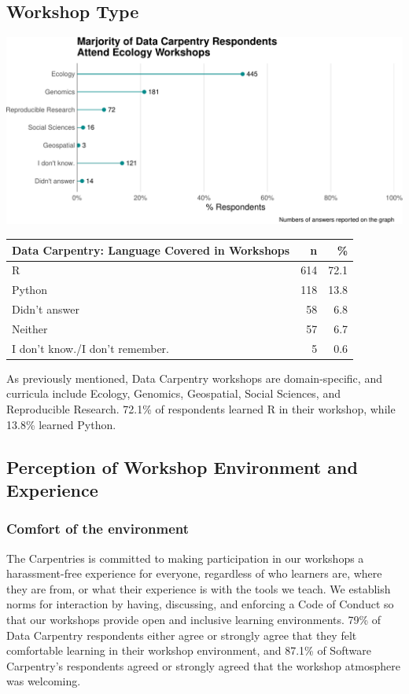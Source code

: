 \documentclass[]{article}
\makeatletter
\def\maxwidth{\ifdim\Gin@nat@width>\linewidth\linewidth\else\Gin@nat@width\fi}
\makeatother
\begin{document}
\subsection{Workshop Type}\label{workshop-type}

\includegraphics[width=\maxwidth]{../figures/dc-workshop-type-plot-1}

\begin{longtable}[]{@{}lrr@{}}
\toprule
Data Carpentry: Language Covered in Workshops & n & \%\tabularnewline
\midrule
\endhead
R & 614 & 72.1\tabularnewline
Python & 118 & 13.8\tabularnewline
Didn't answer & 58 & 6.8\tabularnewline
Neither & 57 & 6.7\tabularnewline
I don't know./I don't remember. & 5 & 0.6\tabularnewline
\bottomrule
\end{longtable}

As previously mentioned, Data Carpentry workshops are domain-specific,
and curricula include Ecology, Genomics, Geospatial, Social Sciences,
and Reproducible Research. 72.1\% of respondents learned R in their
workshop, while 13.8\% learned Python.

\subsection{Perception of Workshop Environment and
Experience}\label{perception-of-workshop-environment-and-experience}

\subsubsection{Comfort of the
environment}\label{comfort-of-the-environment}

The Carpentries is committed to making participation in our workshops a
harassment-free experience for everyone, regardless of who learners are,
where they are from, or what their experience is with the tools we
teach. We establish norms for interaction by having, discussing, and
enforcing a Code of Conduct so that our workshops provide open and
inclusive learning environments. 79\% of Data Carpentry respondents
either agree or strongly agree that they felt comfortable learning in
their workshop environment, and 87.1\% of Software Carpentry's
respondents agreed or strongly agreed that the workshop atmosphere was
welcoming.
\end{document}
